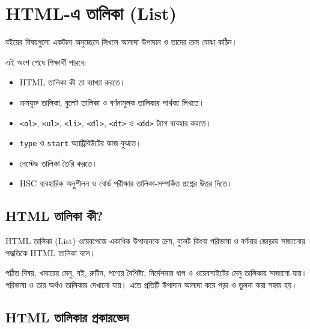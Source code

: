 \section{HTML-এ তালিকা (List)}

বইয়ের বিষয়গুলো একটানা অনুচ্ছেদে লিখলে আলাদা উপাদান ও তাদের ক্রম বোঝা কঠিন।



\begin{learningbox}
এই অংশ শেষে শিক্ষার্থী পারবে:
\begin{itemize}
\item HTML তালিকা কী তা ব্যাখ্যা করতে।
\item ক্রমযুক্ত তালিকা, বুলেট তালিকা ও বর্ণনামূলক তালিকার পার্থক্য লিখতে।
\item \texttt{<ol>}, \texttt{<ul>}, \texttt{<li>}, \texttt{<dl>}, \texttt{<dt>} ও \texttt{<dd>} ট্যাগ ব্যবহার করতে।
\item \texttt{type} ও \texttt{start} অ্যাট্রিবিউটের কাজ বুঝতে।
\item নেস্টেড তালিকা তৈরি করতে।
\item HSC ব্যবহারিক অনুশীলন ও বোর্ড পরীক্ষার তালিকা-সম্পর্কিত প্রশ্নের উত্তর দিতে।
\end{itemize}
\end{learningbox}



\subsection{HTML তালিকা কী?}

\begin{definitionbox}{HTML তালিকা (List)}
ওয়েবপেজে একাধিক উপাদানকে ক্রম, বুলেট কিংবা পরিভাষা ও বর্ণনার জোড়ায় সাজানোর পদ্ধতিকে HTML তালিকা বলে।
\end{definitionbox}

পঠিত বিষয়, খাবারের মেনু, বই, রুটিন, পণ্যের বৈশিষ্ট্য, নির্দেশনার ধাপ ও ওয়েবসাইটের মেনু তালিকায় সাজানো যায়। পরিভাষা ও তার অর্থও তালিকায় দেখানো যায়। এতে প্রতিটি উপাদান আলাদা করে পড়া ও তুলনা করা সহজ হয়।




\subsection{HTML তালিকার প্রকারভেদ}

